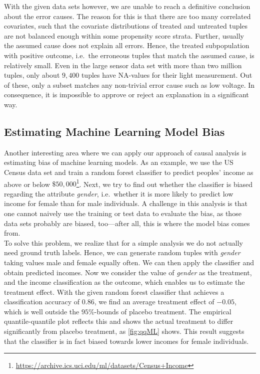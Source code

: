 \documentclass[acmsmall, nonacm, screen]{acmart} %
\begin{document}
With the given data sets however, we are unable to reach a definitive conclusion about the error causes.
The reason for this is that there are too many correlated covariates, such that the covariate distributions of treated and untreated tuples are not balanced enough within some propensity score strata.
Further, usually the assumed cause does not explain all errors. Hence, the treated subpopulation with positive outcome, i.e.\ the erroneous tuples that match the assumed cause, is relatively small. 
Even in the large sensor data set with more than two million tuples, only about $9,400$ tuples have NA-values for their light measurement. Out of these, only a subset matches any non-trivial error cause such as low voltage.
In consequence, it is impossible to approve or reject an explanation in a significant way.

\subsection{Estimating Machine Learning Model Bias}
Another interesting area where we can apply our approach of causal analysis is estimating bias of machine learning models.
As an example, we use the US Census data set and train a random forest classifier to predict peoples' income as above or below $\$50,000$\footnote{\url{https://archive.ics.uci.edu/ml/datasets/Census+Income}}.
Next, we try to find out whether the classifier is biased regarding the attribute \textit{gender}, i.e.\ whether it is more likely to predict low income for female than for male individuals.
A challenge in this analysis is that one cannot naively use the training or test data to evaluate the bias, as those data sets probably are biased, too---after all, this is where the model bias comes from.\\

To solve this problem, we realize that for a simple analysis we do not actually need ground truth labels. 
Hence, we can generate random tuples with \textit{gender} taking values male and female equally often. We can then apply the classifier and obtain predicted incomes. 
Now we consider the value of \textit{gender} as the treatment, and the income classification as the outcome, which enables us to estimate the treatment effect.
With the given random forest classifier that achieves a classification accuracy of $0.86$, we find an average treatment effect of $-0.05$, which is well outside the $95\%$-bounds of placebo treatment.
The empirical quantile-quantile plot reflects this and shows the actual treatment to differ significantly from placebo treatment, as \autoref{fig:qqML} shows.
This result suggests that the classifier is in fact biased towards lower incomes for female individuals.\\
\end{document}

